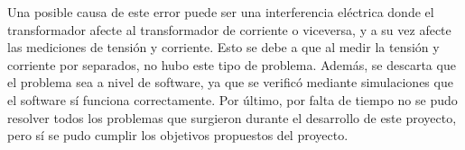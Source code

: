 Una posible causa de este error puede ser una interferencia eléctrica donde el transformador afecte al transformador de corriente o viceversa, y a su vez afecte las mediciones de tensión y corriente. Esto se debe a que al medir la tensión y corriente por separados, no hubo este tipo de problema. Además, se descarta que el problema sea a nivel de software, ya que se verificó mediante simulaciones que el software sí funciona correctamente. Por último, por falta de tiempo no se pudo resolver todos los problemas que surgieron durante el desarrollo de este proyecto, pero sí se pudo cumplir los objetivos propuestos del proyecto.
\FloatBarrier


































